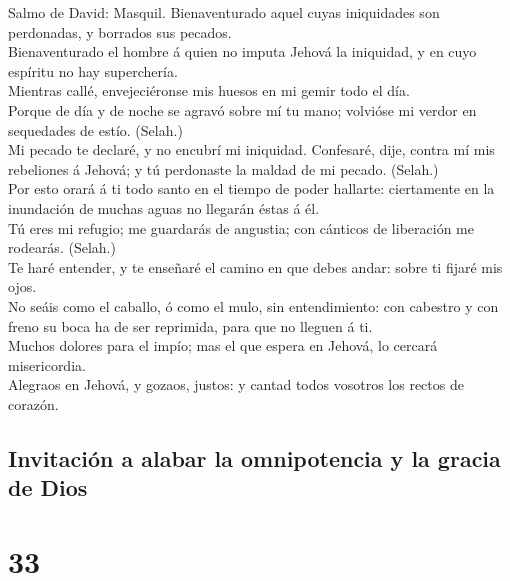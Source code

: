  Salmo de David: Masquil. Bienaventurado aquel cuyas
iniquidades son perdonadas, y borrados sus pecados.\\
 Bienaventurado el hombre á quien no imputa Jehová la
iniquidad, y en cuyo espíritu no hay superchería.\\
 Mientras callé, envejeciéronse mis huesos en mi gemir
todo el día.\\
 Porque de día y de noche se agravó sobre mí tu mano;
volvióse mi verdor en sequedades de estío. (Selah.)\\
 Mi pecado te declaré, y no encubrí mi iniquidad.
Confesaré, dije, contra mí mis rebeliones á Jehová; y tú perdonaste la
maldad de mi pecado. (Selah.)\\
 Por esto orará á ti todo santo en el tiempo de poder
hallarte: ciertamente en la inundación de muchas aguas no llegarán éstas
á él.\\
 Tú eres mi refugio; me guardarás de angustia; con
cánticos de liberación me rodearás. (Selah.)\\
 Te haré entender, y te enseñaré el camino en que debes
andar: sobre ti fijaré mis ojos.\\
 No seáis como el caballo, ó como el mulo, sin
entendimiento: con cabestro y con freno su boca ha de ser reprimida,
para que no lleguen á ti.\\
 Muchos dolores para el impío; mas el que espera en
Jehová, lo cercará misericordia.\\
 Alegraos en Jehová, y gozaos, justos: y cantad todos
vosotros los rectos de corazón.

\hypertarget{invitaciuxf3n-a-alabar-la-omnipotencia-y-la-gracia-de-dios}{%
\subsection{Invitación a alabar la omnipotencia y la gracia de
Dios}\label{invitaciuxf3n-a-alabar-la-omnipotencia-y-la-gracia-de-dios}}

\hypertarget{section-19-33}{%
\section{33}\label{section-19-33}}

